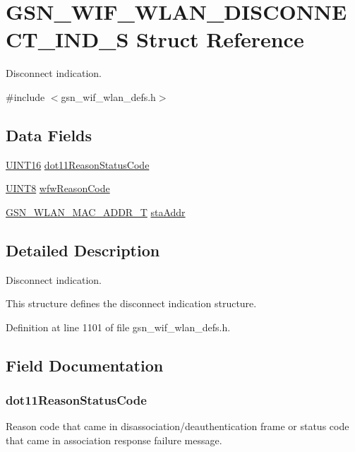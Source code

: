 \hypertarget{a00379}{
\section{GSN\_\-WIF\_\-WLAN\_\-DISCONNECT\_\-IND\_\-S Struct Reference}
\label{a00379}
}


Disconnect indication.  




{\ttfamily \#include $<$gsn\_\-wif\_\-wlan\_\-defs.h$>$}

\subsection*{Data Fields}
\begin{DoxyCompactItemize}
\item 
\hyperlink{a00660_ga09f1a1fb2293e33483cc8d44aefb1eb1}{UINT16} \hyperlink{a00379_a23e5c29cfef114db5bd8d62b056eaa6a}{dot11ReasonStatusCode}
\item 
\hyperlink{a00660_gab27e9918b538ce9d8ca692479b375b6a}{UINT8} \hyperlink{a00379_ad2ec4d4ec0152e0fd6348e39dcd07afd}{wfwReasonCode}
\item 
\hyperlink{a00416}{GSN\_\-WLAN\_\-MAC\_\-ADDR\_\-T} \hyperlink{a00379_a3ca54ba7eb6c301c5b6584284a9ccb8b}{staAddr}
\end{DoxyCompactItemize}


\subsection{Detailed Description}
Disconnect indication. 

This structure defines the disconnect indication structure. 

Definition at line 1101 of file gsn\_\-wif\_\-wlan\_\-defs.h.



\subsection{Field Documentation}
\hypertarget{a00379_a23e5c29cfef114db5bd8d62b056eaa6a}{
\subsubsection[{dot11ReasonStatusCode}]{ {\bf dot11ReasonStatusCode}}}
\label{a00379_a23e5c29cfef114db5bd8d62b056eaa6a}
Reason code that came in disassociation/deauthentication frame or status code that came in association response failure message. 


